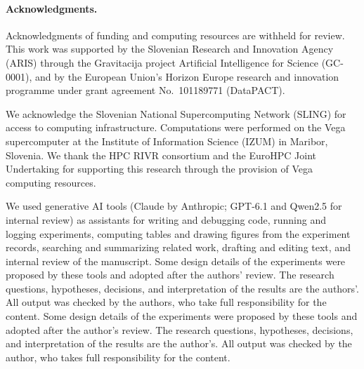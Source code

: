 
\paragraph{Acknowledgments.}
\ifanonymous
Acknowledgments of funding and computing resources are withheld for review.
\else
This work was supported by the Slovenian Research and Innovation Agency (ARIS) through the Gravitacija project Artificial Intelligence for Science (GC-0001), and by the European Union's Horizon Europe research and innovation programme under grant agreement No.~101189771 (DataPACT).

We acknowledge the Slovenian National Supercomputing Network (SLING) for access to computing infrastructure. Computations were performed on the Vega supercomputer at the Institute of Information Science (IZUM) in Maribor, Slovenia. We thank the HPC RIVR consortium and the EuroHPC Joint Undertaking for supporting this research through the provision of Vega computing resources.
\fi

We used generative AI tools (Claude by Anthropic; GPT-6.1 and Qwen2.5 for internal review) as assistants for writing and debugging code, running and logging experiments, computing tables and drawing figures from the experiment records, searching and summarizing related work, drafting and editing text, and internal review of the manuscript. \ifanonymous
Some design details of the experiments were proposed by these tools and adopted after the authors' review. The research questions, hypotheses, decisions, and interpretation of the results are the authors'. All output was checked by the authors, who take full responsibility for the content.
\else
Some design details of the experiments were proposed by these tools and adopted after the author's review. The research questions, hypotheses, decisions, and interpretation of the results are the author's. All output was checked by the author, who takes full responsibility for the content.
\fi
